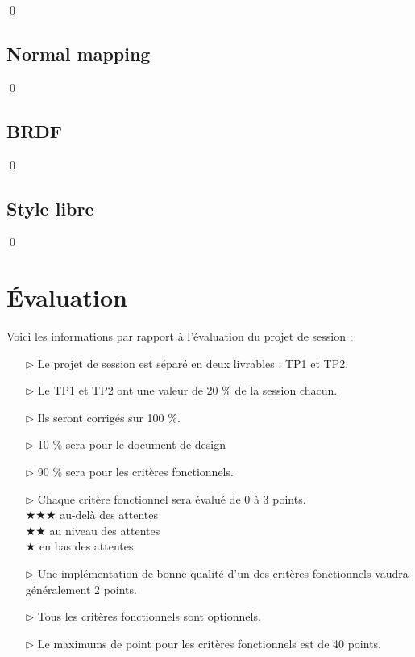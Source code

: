 \documentclass[12pt]{article}
\newcommand{\state}{\noindent}
\begin{document}
\state

\qed

\subsection{Normal mapping}

\state

\qed

\subsection{BRDF}

\state

\qed

\subsection{Style libre}

\state

\qed

\pagebreak

\section*{Évaluation}

\state
Voici les informations par rapport à l'évaluation du projet de session :

\begin{itemize}
\item[$\triangleright$] Le projet de session est séparé en deux livrables : TP1 et TP2.
\item[$\triangleright$] Le TP1 et TP2 ont une valeur de 20 \% de la session chacun.
\item[$\triangleright$] Ils seront corrigés sur 100 \%.
\item[$\triangleright$] 10 \% sera pour le document de design
\item[$\triangleright$] 90 \% sera pour les critères fonctionnels.
\item[$\triangleright$] Chaque critère fonctionnel sera évalué de 0 à 3 points. \\
$\bigstar\bigstar\bigstar$ au-delà des attentes\\
$\bigstar\bigstar$ au niveau des attentes\\
$\bigstar$ en bas des attentes
\item[$\triangleright$] Une implémentation de bonne qualité d'un des critères fonctionnels vaudra généralement 2 points.
\item[$\triangleright$] Tous les critères fonctionnels sont optionnels.
\item[$\triangleright$] Le maximums de point pour les critères fonctionnels est de 40 points. \\
\end{itemize}
\end{document}
